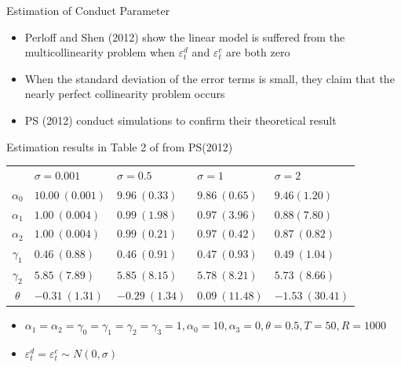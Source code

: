 \documentclass[aspectratio = 169]{beamer}
\theoremstyle{definition}
\begin{document}
\begin{frame}{Estimation of Conduct Parameter}
    \begin{itemize}
        \item Perloff and Shen (2012) show the linear model is suffered from the multicollinearity problem         
        when $\varepsilon^{d}_{t}$ and $\varepsilon^{c}_{t}$ are both zero
        \item When the standard deviation of the error terms is small, they claim that the nearly perfect collinearity problem occurs
        \item PS (2012) conduct simulations to confirm their theoretical result
    \end{itemize}
\end{frame}

\begin{frame}{Estimation results in Table 2 of from PS(2012)}
    \begin{table}[!htbp]
    \label{tb:linear_linear_sigma_Perloff_Shen}
    \begin{center}
        \begin{tabular}{cllll}
            \hline
            & $\sigma=0.001$ & $\sigma=0.5$ & $\sigma=1$ & $\sigma=2$ \\
            $\alpha_0$ & $10.00\ (0.001)$ & $9.96\ (0.33)$ & $9.86\ (0.65)$ & $9.46 (1.20)$ \\
            $\alpha_1$ & $1.00\ (0.004)$ & $0.99\ (1.98)$ & $0.97\ (3.96)$ & $0.88 (7.80)$ \\
            $\alpha_2$ & $1.00\ (0.004)$ & $0.99\ (0.21)$ & $0.97\ (0.42)$ & $0.87\ (0.82)$ \\
            $\gamma_1$ & $0.46\ (0.88)$ & $0.46\ (0.91)$ & $0.47\ (0.93)$ & $0.49\ (1.04)$ \\
            $\gamma_2$ & $5.85\ (7.89)$ & $5.85\ (8.15)$ & $5.78\ (8.21)$ & $5.73\ (8.66)$ \\
            $\theta$ & $-0.31\ (1.31)$ & $-0.29\ (1.34)$ & $0.09\ (11.48)$ & $-1.53\ (30.41)$ \\
            \hline
        \end{tabular}
    \end{center}
    \end{table}
    \begin{itemize}
        \item $\alpha_1 = \alpha_2 = \gamma_0 = \gamma_1 = \gamma_2  = \gamma_3 = 1, \alpha_0 = 10, \alpha_3 = 0,  \theta = 0.5, T = 50, R = 1000$
        \item $\varepsilon_t^d = \varepsilon_t^c \sim N(0,\sigma) $
    \end{itemize}
\end{frame}
\end{document}
